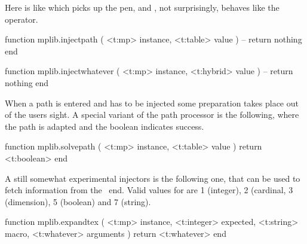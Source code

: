 \stoptyping

Here  is like \type [option=MP] {&&} which picks up the
pen, and , not surprisingly, behaves like the  operator.

\starttyping[option=LUA]
function mplib.injectpath ( <t:mp> instance,  <t:table> value )
    -- return nothing
end
\stoptyping

\starttyping[option=LUA]
function mplib.injectwhatever ( <t:mp> instance, <t:hybrid> value )
    -- return nothing
end
\stoptyping

When a path is entered and has to be injected some preparation takes place out of
the users sight. A special variant of the path processor is the following, where
the path is adapted and the boolean indicates success.

\starttyping[option=LUA]
function mplib.solvepath ( <t:mp> instance, <t:table> value )
    return <t:boolean>
end
\stoptyping

A still somewhat experimental injectors is the following one, that can be used to
fetch information from the \TEX\ end. Valid values for  are 1
(integer), 2 (cardinal, 3 (dimension), 5 (boolean) and 7 (string).

\starttyping[option=LUA]
function mplib.expandtex (
    <t:mp>       instance,
    <t:integer>  expected,
    <t:string>   macro,
    <t:whatever> arguments
)
    return <t:whatever>
end
\stoptyping

\stopsubsection

\stopsection

\stopdocument
